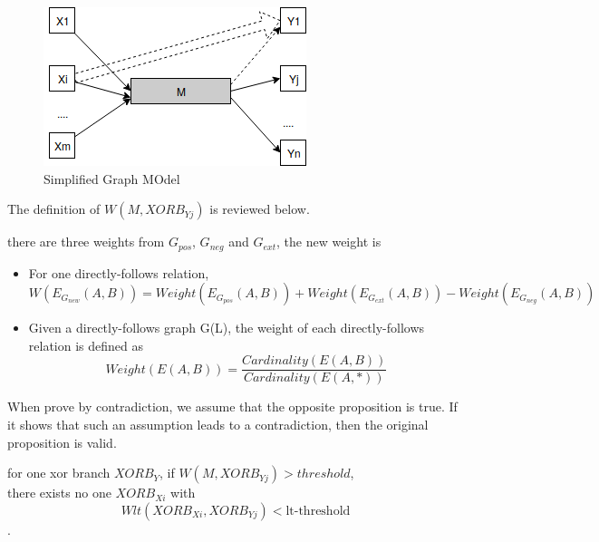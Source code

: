 \begin{figure}[!h]
	\includegraphics[width=\textwidth]{figures/algorithm/RelationOfThreshold-LTThreshold.png}
	\caption{Simplified Graph MOdel}
	\label{fig:simplified-graph-model}
\end{figure}

The definition of $W(M, XORB_{Yj})$ is reviewed below.
\begin{definition}
	there are three weights from $G_{pos}$, $G_{neg}$ and $G_{ext}$, the new weight is 
	\begin{itemize}
		\item For one directly-follows relation, \[ W(E_{G_{new}}(A,B)) = Weight(E_{G_{pos}}(A,B)) + Weight(E_{G_{ext}}(A,B)) - Weight(E_{G_{neg}}(A,B))\]
		\item Given a directly-follows graph G(L), the weight of each directly-follows relation is defined as \[ Weight(E(A,B)) = \frac{Cardinality(E(A,B))}{Cardinality(E(A,*))}  \] 
	\end{itemize}
\end{definition}

When prove by contradiction, we assume that the opposite proposition is true. If it shows that such an assumption leads to a contradiction, then the original proposition is valid. 
\begin{proposition}
	for one xor branch $XORB_Y$, if $W(M, XORB_{Yj}) > threshold$, \\ there exists no one $XORB_{Xi}$ with 
	\[Wlt(XORB_{Xi}, XORB_{Yj})<\text{lt-threshold}\]. 
\end{proposition}

